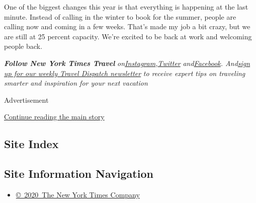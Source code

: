 One of the biggest changes this year is that everything is happening at
the last minute. Instead of calling in the winter to book for the
summer, people are calling now and coming in a few weeks. That's made my
job a bit crazy, but we are still at 25 percent capacity. We're excited
to be back at work and welcoming people back.

\emph{\textbf{Follow New York Times Travel}}
\emph{on}\href{https://www.instagram.com/nytimestravel/}{\emph{Instagram}}\emph{,}\href{https://twitter.com/nytimestravel}{\emph{Twitter}}
\emph{and}\href{https://www.facebookcorewwwi.onion/nytimestravel/}{\emph{Facebook}}\emph{.
And}\href{https://www.nytimes3xbfgragh.onion/newsletters/traveldispatch}{\emph{sign
up for our weekly Travel Dispatch newsletter}} \emph{to receive expert
tips on traveling smarter and inspiration for your next vacation}

Advertisement

\protect\hyperlink{after-bottom}{Continue reading the main story}

\hypertarget{site-index}{%
\subsection{Site Index}\label{site-index}}

\hypertarget{site-information-navigation}{%
\subsection{Site Information
Navigation}\label{site-information-navigation}}

\begin{itemize}
\tightlist
\item
  \href{https://help.nytimes3xbfgragh.onion/hc/en-us/articles/115014792127-Copyright-notice}{©~2020~The
  New York Times Company}
\end{itemize}

